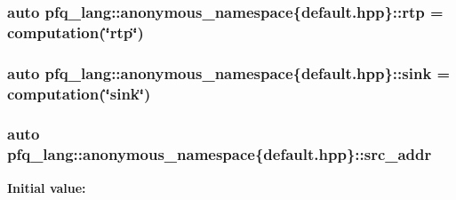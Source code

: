 \hypertarget{namespacepfq__lang_1_1anonymous__namespace_02default_8hpp_03_a13ac072f4d7f860256ef22d7f5a1a9ac}{
\subsubsection[{rtp}]{\setlength{\rightskip}{0pt plus 5cm}auto pfq\-\_\-lang\-::anonymous\-\_\-namespace\{default.\-hpp\}\-::rtp = {\bf computation}(\char`\"{}rtp\char`\"{})}}\label{namespacepfq__lang_1_1anonymous__namespace_02default_8hpp_03_a13ac072f4d7f860256ef22d7f5a1a9ac}
\hypertarget{namespacepfq__lang_1_1anonymous__namespace_02default_8hpp_03_ad708862e729d0cc6a217d86bb25b1061}{
\subsubsection[{sink}]{\setlength{\rightskip}{0pt plus 5cm}auto pfq\-\_\-lang\-::anonymous\-\_\-namespace\{default.\-hpp\}\-::sink = {\bf computation}(\char`\"{}sink\char`\"{})}}\label{namespacepfq__lang_1_1anonymous__namespace_02default_8hpp_03_ad708862e729d0cc6a217d86bb25b1061}
\hypertarget{namespacepfq__lang_1_1anonymous__namespace_02default_8hpp_03_a63c87ff605d7cefa807fd61bc463785d}{
\subsubsection[{src\-\_\-addr}]{\setlength{\rightskip}{0pt plus 5cm}auto pfq\-\_\-lang\-::anonymous\-\_\-namespace\{default.\-hpp\}\-::src\-\_\-addr}}\label{namespacepfq__lang_1_1anonymous__namespace_02default_8hpp_03_a63c87ff605d7cefa807fd61bc463785d}
{\bfseries Initial value\-:}
